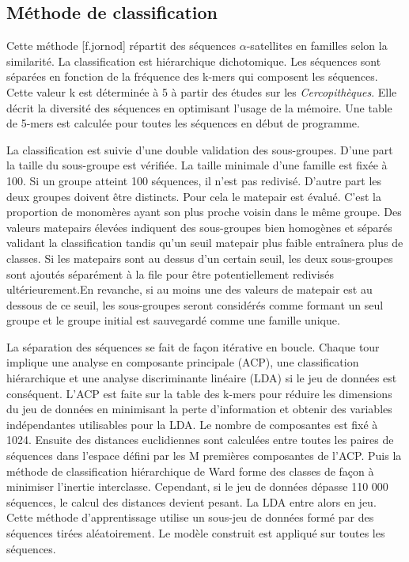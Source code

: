 \documentclass[12pt,a4paper]{article}
\begin{document}
 
\subsection{Méthode de classification}

Cette méthode [f.jornod] répartit des séquences $\alpha$-satellites en familles selon la similarité. La classification est hiérarchique dichotomique. Les séquences sont séparées en fonction de la fréquence des k-mers qui composent les séquences. Cette valeur k est déterminée à 5 à partir des études sur les \textit{Cercopithèques}. Elle décrit la diversité des séquences en optimisant l'usage de la mémoire. Une table de 5-mers est calculée pour toutes les séquences en début de programme.

La classification est suivie d'une double validation des sous-groupes. D'une part la taille du sous-groupe est vérifiée. La taille minimale d'une famille est fixée à 100. Si un groupe atteint 100 séquences, il n'est pas redivisé. D'autre part les deux groupes doivent être distincts. Pour cela le matepair est évalué. C'est la proportion de monomères ayant son plus proche voisin dans le même groupe. Des valeurs matepairs élevées indiquent des sous-groupes bien homogènes et séparés validant la classification tandis qu’un seuil matepair plus faible entraînera plus de classes. Si les matepairs sont au dessus d’un certain seuil, les deux sous-groupes sont ajoutés séparément à la file pour être potentiellement redivisés ultérieurement.En revanche, si au moins une des valeurs de matepair est au dessous de ce seuil, les sous-groupes seront considérés comme formant un seul groupe et le groupe initial est sauvegardé comme une famille unique. 

La séparation des séquences se fait de façon itérative en boucle. Chaque tour implique une analyse en composante principale (ACP), une classification hiérarchique et une analyse discriminante linéaire (LDA) si le jeu de données est conséquent. L'ACP est faite sur la table des k-mers pour réduire les dimensions du jeu de données en minimisant la perte d'information et obtenir des variables indépendantes utilisables pour la LDA. Le nombre de composantes est fixé à 1024. Ensuite des distances euclidiennes sont calculées entre toutes les paires de séquences dans l’espace défini par les M premières composantes de l’ACP. Puis la méthode de classification hiérarchique de Ward forme des classes de façon à minimiser l’inertie interclasse. Cependant, si le jeu de données dépasse 110 000 séquences, le calcul des distances devient pesant. La LDA entre alors en jeu. Cette méthode d'apprentissage utilise un sous-jeu de données formé par des séquences tirées aléatoirement. Le modèle construit est appliqué sur toutes les séquences.
\end{document}
